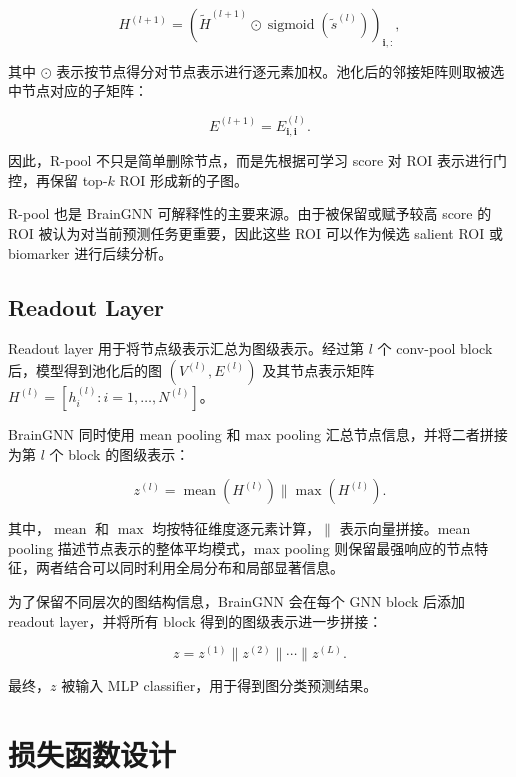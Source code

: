 \begin{equation}
  H^{(l+1)}
  =
  \left(
    \tilde{H}^{(l+1)}
    \odot
    \operatorname{sigmoid}(\tilde{s}^{(l)})
  \right)_{\mathbf{i},:},
\end{equation}

其中 $\odot$ 表示按节点得分对节点表示进行逐元素加权。池化后的邻接矩阵则取被选中节点对应的子矩阵：

\begin{equation}
  E^{(l+1)}
  =
  E^{(l)}_{\mathbf{i},\mathbf{i}}.
\end{equation}

因此，R-pool 不只是简单删除节点，而是先根据可学习 score 对 ROI 表示进行门控，再保留 top-$k$ ROI 形成新的子图。

R-pool 也是 BrainGNN 可解释性的主要来源。由于被保留或赋予较高 score 的 ROI 被认为对当前预测任务更重要，因此这些 ROI 可以作为候选 salient ROI 或 biomarker 进行后续分析。

\subsection{Readout Layer}

Readout layer 用于将节点级表示汇总为图级表示。经过第 $l$ 个 conv-pool block 后，模型得到池化后的图 $(V^{(l)},E^{(l)})$ 及其节点表示矩阵 $H^{(l)}=[h_i^{(l)}:i=1,\dots,N^{(l)}]$。

BrainGNN 同时使用 mean pooling 和 max pooling 汇总节点信息，并将二者拼接为第 $l$ 个 block 的图级表示：

\begin{equation}
  z^{(l)}
  =
  \operatorname{mean}(H^{(l)})
  \|
  \operatorname{max}(H^{(l)}).
\end{equation}

其中，$\operatorname{mean}$ 和 $\operatorname{max}$ 均按特征维度逐元素计算，$\|$ 表示向量拼接。mean pooling 描述节点表示的整体平均模式，max pooling 则保留最强响应的节点特征，两者结合可以同时利用全局分布和局部显著信息。

为了保留不同层次的图结构信息，BrainGNN 会在每个 GNN block 后添加 readout layer，并将所有 block 得到的图级表示进一步拼接：

\begin{equation}
  z
  =
  z^{(1)}
  \|
  z^{(2)}
  \|
  \cdots
  \|
  z^{(L)}.
\end{equation}

最终，$z$ 被输入 MLP classifier，用于得到图分类预测结果。

\section{损失函数设计}

